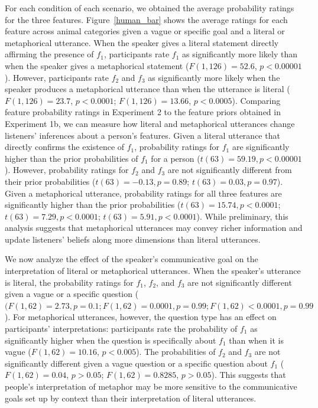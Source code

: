 \documentclass[10pt,letterpaper]{article}
\begin{document}
For each condition of each scenario, we obtained the average probability ratings for the three features. Figure~\ref{human_bar} shows the average ratings for each feature across animal categories given a vague or specific goal and a literal or metaphorical utterance. When the speaker gives a literal statement directly affirming the presence of $f_1$, participants rate $f_1$ as significantly more likely than when the speaker gives a metaphorical statement ($F(1, 126) = 52.6$, $p < 0.00001$). However, participants rate $f_2$ and $f_3$ as significantly more likely when the speaker produces a metaphorical utterance than when the utterance is literal ($F(1, 126) = 23.7$, $p < 0.0001$; $F(1, 126) =13.66$, $p < 0.0005$). Comparing feature probability ratings in Experiment 2 to the feature priors obtained in Experiment 1b, we can measure how literal and metaphorical utterances change listeners' inferences about a person's features. Given a literal utterance that directly confirms the existence of $f_1$, probability ratings for $f_1$ are significantly higher than the prior probabilities of $f_1$ for a person ($t(63) = 59.19, p < 0.00001$). However, probability ratings for $f_2$ and $f_3$ are not significantly different from their prior probabilities ($t(63) = -0.13, p = 0.89$; $t(63) = 0.03, p = 0.97$). Given a metaphorical utterance, probability ratings for all three features are significantly higher than the prior probabilities ($t(63) = 15.74, p < 0.0001$; $t(63) = 7.29, p < 0.0001$; $t(63) = 5.91, p < 0.0001$). While preliminary, this analysis suggests that metaphorical utterances may convey richer information and update listeners' beliefs along more dimensions than literal utterances.

We now analyze the effect of the speaker's communicative goal on the interpretation of literal or metaphorical utterances. When the speaker's utterance is literal, the probability ratings for $f_1$, $f_2$, and $f_3$ are not significantly different given a vague or a specific question ($(F(1, 62)= 2.73, p =0.1; F(1, 62)=0.0001, p = 0.99; F(1, 62) < 0.0001, p = 0.99$). For metaphorical utterances, however, the question type has an effect on participants' interpretations: participants rate the probability of $f_1$ as significantly higher when the question is specifically about $f_1$ than when it is vague ($F(1, 62) = 10.16$, $p < 0.005$). The probabilities of $f_2$ and $f_3$ are not significantly different given a vague question or a specific question about $f_1$ ($F(1, 62) = 0.04$, $p > 0.05$; $F(1, 62) = 0.8285$, $p > 0.05$). This suggests that people's interpretation of metaphor may be more sensitive to the communicative goals set up by context than their interpretation of literal utterances.
\end{document}
